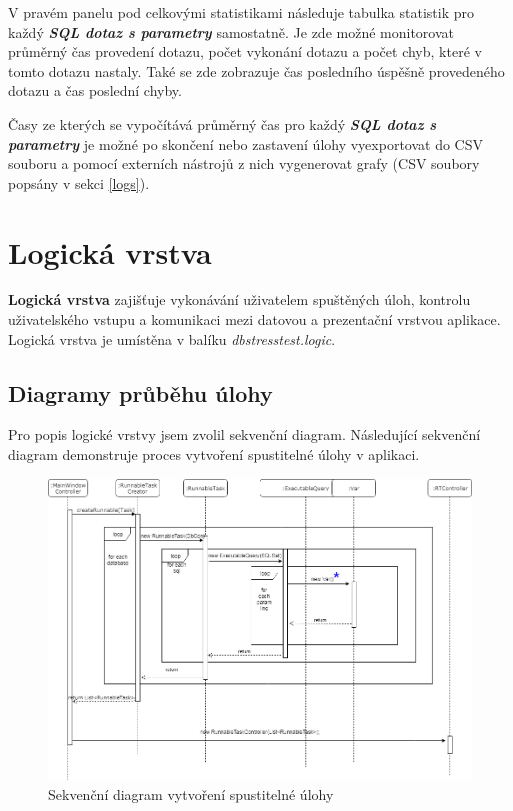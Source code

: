 \documentclass[czech,bachelor,public,dept460,male,cpdeclaration,twoside]{diploma}
\begin{document}
V pravém panelu pod celkovými statistikami následuje tabulka statistik pro každý \textbf{\emph{SQL dotaz s parametry}} samostatně. Je zde možné monitorovat průměrný čas provedení dotazu, počet vykonání dotazu a počet chyb, které v tomto dotazu nastaly. Také se zde zobrazuje čas posledního úspěšně provedeného dotazu a čas poslední chyby.

Časy ze kterých se vypočítává průměrný čas pro každý \textbf{\emph{SQL dotaz s parametry}} je možné po skončení nebo zastavení úlohy vyexportovat do CSV souboru a pomocí externích nástrojů z nich vygenerovat grafy (CSV soubory popsány v sekci \ref{logs}).



\newpage
\section{Logická vrstva} \label{logiclayer}
\textbf{Logická vrstva} zajišťuje vykonávání uživatelem spuštěných úloh, kontrolu uživatelského vstupu a komunikaci mezi datovou a prezentační vrstvou aplikace. Logická vrstva je umístěna v balíku \textit{dbstresstest.logic}.
\subsection{Diagramy průběhu úlohy} \label{logic}
Pro popis logické vrstvy jsem zvolil sekvenční diagram. Následující sekvenční diagram demonstruje proces vytvoření spustitelné úlohy v aplikaci.

\begin{figure}[!htbp]\centering\includegraphics[width=1.0\textwidth]{Figures/rtprocess.png}\caption{Sekvenční diagram vytvoření spustitelné úlohy}
\label{seq1}
\end{figure}
\end{document}
